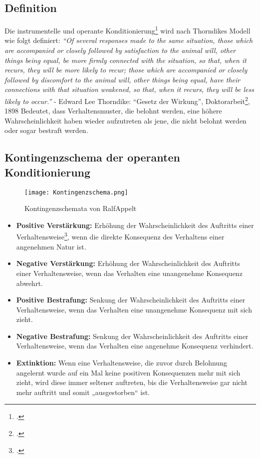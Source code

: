 \subsection{Definition}	
Die instrumentelle und operante Konditionierung\footcite{operant-conditioning2} wird nach Thorndikes Modell wie folgt definiert: 
\textit{“Of several responses made to the same situation, those which are accompanied or closely followed by satisfaction to the animal will, other things being equal, be more firmly connected with the situation, so that, when it recurs, they will be more likely to recur; those which are accompanied or closely followed by discomfort to the animal will, other things being equal, have their connections with that situation weakened, so that, when it recurs, they will be less likely to occur.”} 
- Edward Lee Thorndike: “Gesetz der Wirkung”, Doktorarbeit\footcite{operant-conditioning}, 1898 
Bedeutet, dass Verhaltensmuster, die belohnt werden, eine höhere Wahrscheinlichkeit haben wieder aufzutreten als jene, die nicht belohnt werden oder sogar bestraft werden. 
\subsection{Kontingenzschema der operanten Konditionierung}	
\begin{center}
\begin{figure}[h]
	\centering
 \texttt{[image: Kontingenzschema.png]}
	\caption{Kontingenzschemata von RalfAppelt}
\end{figure}
\end{center}
\begin{itemize}
	\item \textbf{Positive Verstärkung:} Erhöhung der Wahrscheinlichkeit des Auftritts einer Verhaltensweise\footcite{operant-conditioning-bild}, wenn die direkte Konsequenz des Verhaltens einer angenehmen Natur ist. 
	\item \textbf{Negative Verstärkung:} Erhöhung der Wahrscheinlichkeit des Auftritts einer Verhaltensweise, wenn das Verhalten eine unangenehme Konsequenz abwehrt.
	\item \textbf{Positive Bestrafung:} Senkung der Wahrscheinlichkeit des Auftritts einer Verhaltensweise, wenn das Verhalten eine unangenehme Konsequenz mit sich zieht.
	\item \textbf{Negative Bestrafung:} Senkung der Wahrscheinlichkeit des Auftritts einer Verhaltensweise, wenn das Verhalten eine angenehme Konsequenz verhindert. 
	\item \textbf{Extinktion:} Wenn eine Verhaltensweise, die zuvor durch Belohnung angelernt wurde auf ein Mal keine positiven Konsequenzen mehr mit sich zieht, wird diese immer seltener auftreten, bis die Verhaltensweise gar nicht mehr auftritt und somit „ausgestorben“ ist. 
\end{itemize}
